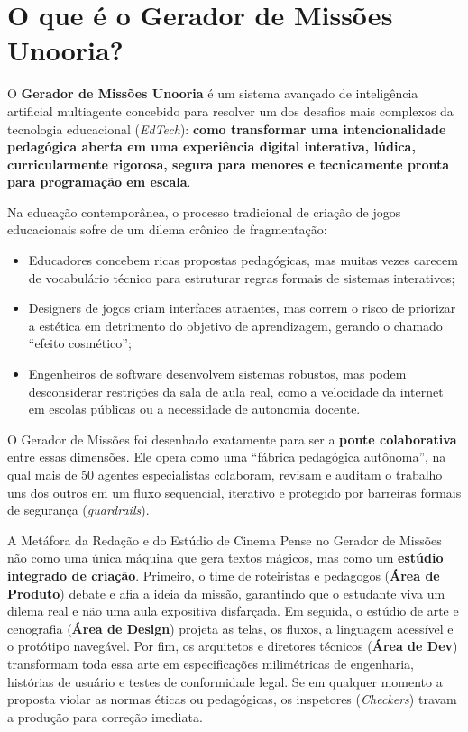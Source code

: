 \documentclass[11pt,a4paper]{article}
\begin{document}
\tableofcontents
\newpage

\section{O que é o Gerador de Missões Unooria?}
\label{sec:intro}

O \textbf{Gerador de Missões Unooria} é um sistema avançado de inteligência artificial multiagente concebido para resolver um dos desafios mais complexos da tecnologia educacional (\textit{EdTech}): \textbf{como transformar uma intencionalidade pedagógica aberta em uma experiência digital interativa, lúdica, curricularmente rigorosa, segura para menores e tecnicamente pronta para programação em escala}.

Na educação contemporânea, o processo tradicional de criação de jogos educacionais sofre de um dilema crônico de fragmentação:
\begin{itemize}[noitemsep]
  \item Educadores concebem ricas propostas pedagógicas, mas muitas vezes carecem de vocabulário técnico para estruturar regras formais de sistemas interativos;
  \item Designers de jogos criam interfaces atraentes, mas correm o risco de priorizar a estética em detrimento do objetivo de aprendizagem, gerando o chamado ``efeito cosmético'';
  \item Engenheiros de software desenvolvem sistemas robustos, mas podem desconsiderar restrições da sala de aula real, como a velocidade da internet em escolas públicas ou a necessidade de autonomia docente.
\end{itemize}

O Gerador de Missões foi desenhado exatamente para ser a \textbf{ponte colaborativa} entre essas dimensões. Ele opera como uma ``fábrica pedagógica autônoma'', na qual mais de 50 agentes especialistas colaboram, revisam e auditam o trabalho uns dos outros em um fluxo sequencial, iterativo e protegido por barreiras formais de segurança (\textit{guardrails}).

\begin{caixaConceito}{A Metáfora da Redação e do Estúdio de Cinema}
Pense no Gerador de Missões não como uma única máquina que gera textos mágicos, mas como um \textbf{estúdio integrado de criação}. 
Primeiro, o time de roteiristas e pedagogos (\textbf{Área de Produto}) debate e afia a ideia da missão, garantindo que o estudante viva um dilema real e não uma aula expositiva disfarçada. 
Em seguida, o estúdio de arte e cenografia (\textbf{Área de Design}) projeta as telas, os fluxos, a linguagem acessível e o protótipo navegável. 
Por fim, os arquitetos e diretores técnicos (\textbf{Área de Dev}) transformam toda essa arte em especificações milimétricas de engenharia, histórias de usuário e testes de conformidade legal. 
Se em qualquer momento a proposta violar as normas éticas ou pedagógicas, os inspetores (\textit{Checkers}) travam a produção para correção imediata.
\end{caixaConceito}
\end{document}
